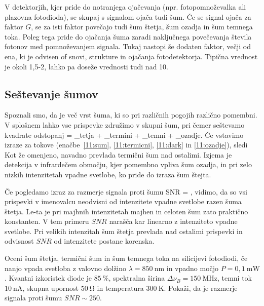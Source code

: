 \begin{remark}
 V detektorjih, kjer pride do notranjega ojačevanja (npr. fotopomnoževalka ali plazovna fotodioda), 
 se skupaj s signalom ojača tudi šum. Če se signal ojača za faktor $G$, se za isti faktor
 povečajo tudi šum štetja, šum ozadja in šum temnega toka. Poleg tega pride do ojačanja šuma
 zaradi naključnega povečevanja števila fotonov med pomnoževanjem signala. Tukaj nastopi
 še dodaten faktor, večji od ena, ki je odvisen of snovi, strukture in ojačanja fotodetektorja. 
 Tipična vrednost je okoli 1,5-2, lahko pa doseže vrednosti tudi nad 10.
\end{remark}

\subsection*{Seštevanje šumov}
Spoznali smo, da je več vrst šuma, ki so pri različnih pogojih različno pomembni. 
V splošnem lahko vse prispevke združimo v skupni šum, pri čemer seštevamo kvadrate
odstopanj
\beq
{} = _{tetja} + 
_{termini} + _{temni} + 
_{ozadje}.
\eeq
Če vstavimo izraze za tokove (enačbe~\ref{11:sum}, \ref{11:termicni}, \ref{11:dark}
in \ref{11:ozadje}), sledi
Kot že omenjeno, navadno prevlada termični šum nad ostalimi. Izjema je detekcija v
infrardečem območju, kjer pomembno vpliva šum ozadja, in pri zelo nizkih intenzitetah 
vpadne svetlobe, ko pride do izraza šum štejta. 

Če pogledamo izraz za razmerje signala proti šumu
\beq
SNR = ,
\eeq
vidimo, da so vsi prispevki v imenovalcu neodvisni od intenzitete vpadne svetlobe
razen šuma štetja. Le-ta je pri majhnih intenzitetah majhen in celoten šum 
zato praktično konstanten. V tem primeru $SNR$ narašča kar linearno z intenziteto
vpadne svetlobe. Pri velikih intenzitah šum štetja prevlada nad ostalimi prispevki
in odvisnost $SNR$ od intenzitete postane korenska. 

\begin{definition}
Oceni šum štetja, termični šum in šum temnega toka na silicijevi fotodiodi, če 
nanjo vpada svetloba z valovno dolžino $\lambda=850~\si{\nano\meter}$
in vpadno močjo $P=0,1~\si{\milli\watt}$. Kvantni izkoristek diode je $85~\%$,
spektralna širina $\Delta\nu_B=150~\si{\mega\hertz}$, temni tok $10~\si{\nano\ampere}$,
skupna upornost $50~\si{\ohm}$ in temperatura $300~\si{\kelvin}$. Pokaži, 
da je razmerje signala proti šumu $SNR\sim250$. 
\end{definition}

